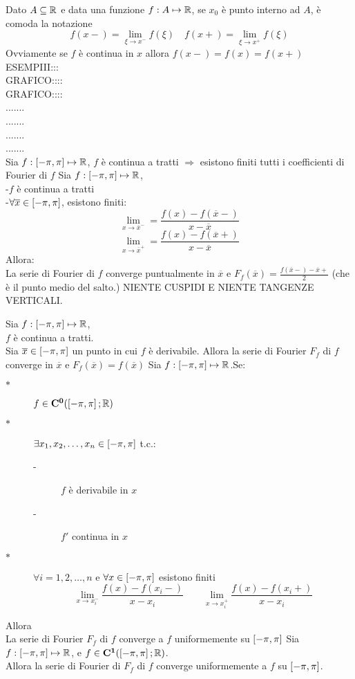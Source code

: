 \observation
Dato $A\subseteq \mathbb{R}$ e data una funzione $f:A \mapsto \mathbb{R}$, se $x_0$ è punto interno ad $A$, è comoda la notazione
$$f(x-)=\lim\limits_{\xi\to x^{-}}f(\xi)\quad f(x+)=\lim\limits_{\xi\to x^{+}}f(\xi)$$
Ovviamente se $f$ è continua in $x$ allora $f(x-)=f(x)=f(x+)$
ESEMPIII:::\\
GRAFICO::::\\
GRAFICO::::\\
.......\\
.......\\
.......\\
.......\\
\proposition
Sia $f: \left[-\pi,\pi\right] \mapsto \mathbb{R}$, $f$ è continua a tratti $\Rightarrow$ esistono finiti tutti i coefficienti di Fourier di $f$
\proposition
Sia $f: \left[-\pi,\pi\right] \mapsto \mathbb{R}$,\\
-$f$ è continua a tratti\\
-$\forall \overline{x} \in\left[-\pi,\pi\right]$, esistono finiti:\\
$$ \lim\limits_{x\to\overline{x}^{-}}=\frac{f(x)-f(\overline{x}-)}{x-\overline{x}} $$
$$ \lim\limits_{x\to\overline{x}^{+}}=\frac{f(x)-f(\overline{x}+)}{x-\overline{x}} $$
Allora:\\
La serie di Fourier di $f$ converge puntualmente in $\overline{x}$ e $F_f(\overline{x})=\frac{f(\overline{x}-)-\overline{x}+}{2}$ (che è il punto medio del salto.)
\observation NIENTE CUSPIDI E NIENTE TANGENZE VERTICALI.

\corollary
Sia $f: \left[-\pi,\pi\right] \mapsto \mathbb{R}$,\\
$f$ è continua a tratti.\\
Sia $\overline{x}\in\left[-\pi,\pi\right]$ un punto in cui $f$ è derivabile. Allora la serie di Fourier $F_f$ di $f$ converge in $\overline{x}$ e $F_f(\overline{x})=f(\overline{x})$
\proposition
Sia $f: \left[-\pi,\pi\right] \mapsto \mathbb{R}$.Se:\\
\begin{description}
	\item[$\ast$] $f\in \mathbf{C^{0}}(\left[-\pi,\pi\right]; \mathbb{R})$
	\item[$\ast$] $\exists x_1,x_2,\dotsc,x_n\in\left[-\pi,\pi\right]$ t.c.:
	\begin{description}
		\item[-] $f$ è derivabile in $x$
		\item[-] $f'$ continua in $x$
	\end{description}
	\item[$\ast$] $\forall i=1,2,\dotsc,n$ e $\forall x\in\left[-\pi,\pi\right]$ esistono finiti
	$$\lim\limits_{x\to x_i^{-}}\frac{f(x)-f(x_i-)}{x-x_i}\qquad \lim\limits_{x\to x_i^{+}}\frac{f(x)-f(x_i+)}{x-x_i}$$

\end{description}
Allora\\
La serie di Fourier $F_f$ di $f$ converge a $f$ uniformemente su $\left[-\pi,\pi\right]$
\corollary
Sia $f: \left[-\pi,\pi\right] \mapsto \mathbb{R}$, e $f\in \mathbf{C^{1}}(\left[-\pi,\pi\right]; \mathbb{R})$.\\
Allora la serie di Fourier di $F_f$ di $f$ converge uniformemente a $f$ su $\left[-\pi,\pi\right]$.